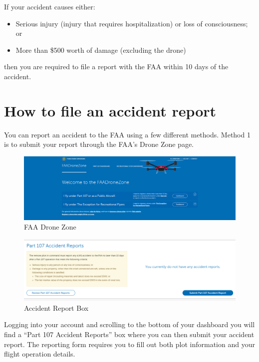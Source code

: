\documentclass[
]{book}
\providecommand{\tightlist}{%
  \setlength{\itemsep}{0pt}\setlength{\parskip}{0pt}}
\begin{document}
If your accident causes either:

\begin{itemize}
\tightlist
\item
  Serious injury (injury that requires hospitalization) or loss of consciousness; or
\item
  More than \$500 worth of damage (excluding the drone)
\end{itemize}

then you are required to file a report with the FAA within 10 days of the accident.

\hypertarget{how-to-file-an-accident-report}{%
\section{How to file an accident report}\label{how-to-file-an-accident-report}}

You can report an accident to the FAA using a few different methods. Method 1 is to submit your report through the FAA's Drone Zone page.

\begin{figure}
\centering
\includegraphics{images/FAA_DroneZone.png}
\caption{FAA Drone Zone}
\end{figure}

\begin{figure}
\centering
\includegraphics{images/DroneZone_AccidentReport.png}
\caption{Accident Report Box}
\end{figure}

Logging into your account and scrolling to the bottom of your dashboard you will find a ``Part 107 Accident Reports'' box where you can then submit your accident report. The reporting form requires you to fill out both plot information and your flight operation details.
\end{document}

